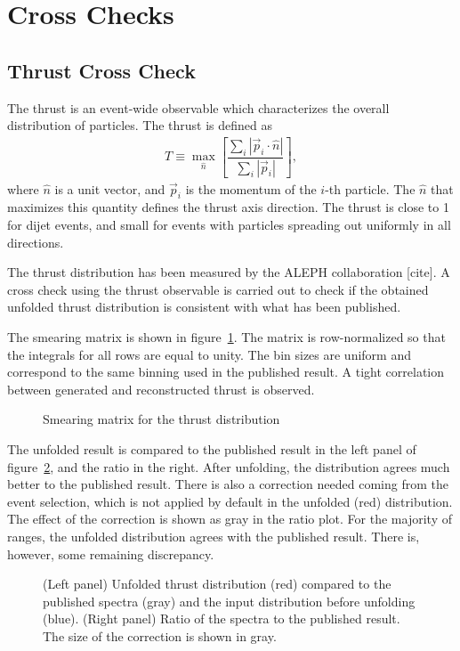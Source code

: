 \section{Cross Checks}\label{Section:CrossCheck}

\subsection{Thrust Cross Check}

The thrust is an event-wide observable which characterizes the overall distribution of particles.  The thrust is defined as
%
\begin{align}
    T \equiv \max_{\hat{n}} \left[ \dfrac{\sum_i | \vec{p}_i \cdot \hat{n} |}{\sum_i | \vec{p}_i |} \right],
\end{align}
%
where $\hat{n}$ is a unit vector, and $\vec{p}_i$ is the momentum of the $i$-th particle.  The $\hat{n}$ that maximizes this quantity defines the thrust axis direction.
The thrust is close to 1 for dijet events, and small for events with particles spreading out uniformly in all directions.

The thrust distribution has been measured by the ALEPH collaboration [cite].  A cross check using the thrust observable is carried out to check if the obtained unfolded thrust distribution is consistent with what has been published.

The smearing matrix is shown in figure~\ref{Figure:CrossCheck-MatrixThrust}.  The matrix is row-normalized so that the integrals for all rows are equal to unity.  The bin sizes are uniform and correspond to the same binning used in the published result.  A tight correlation between generated and reconstructed thrust is observed.
%
\begin{figure}[htp!]
    \centering
    \caption{Smearing matrix for the thrust distribution}
    \label{Figure:CrossCheck-MatrixThrust}
\end{figure}

The unfolded result is compared to the published result in the left panel of figure~\ref{Figure:CrossCheck-UnfoldedThrust}, and the ratio in the right.  After unfolding, the distribution agrees much better to the published result.  There is also a correction needed coming from the event selection, which is not applied by default in the unfolded (red) distribution.  The effect of the correction is shown as gray in the ratio plot.  For the majority of ranges, the unfolded distribution agrees with the published result.  There is, however, some remaining discrepancy.
%
\begin{figure}[htp!]
    \centering
    \caption{(Left panel) Unfolded thrust distribution (red) compared to the published spectra (gray) and the input distribution before unfolding (blue).  (Right panel) Ratio of the spectra to the published result.  The size of the correction is shown in gray.}
    \label{Figure:CrossCheck-UnfoldedThrust}
\end{figure}

